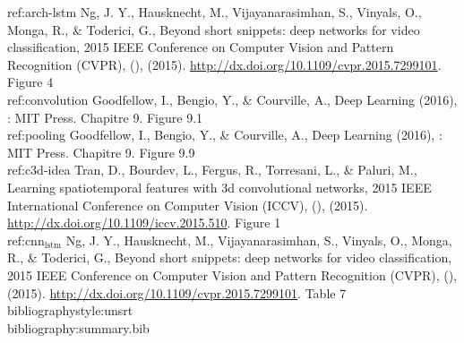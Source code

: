 \documentclass[11pt]{article}
\begin{document}
ref:arch-lstm Ng, J. Y., Hausknecht, M., Vijayanarasimhan, S., Vinyals, O., Monga, R., \& Toderici, G., Beyond short snippets: deep networks for video classification, 2015 IEEE Conference on Computer Vision and Pattern Recognition (CVPR), (),  (2015).  \url{http://dx.doi.org/10.1109/cvpr.2015.7299101}. Figure 4\\

ref:convolution Goodfellow, I., Bengio, Y., \& Courville, A., Deep Learning (2016), : MIT Press. Chapitre 9. Figure 9.1\\

ref:pooling Goodfellow, I., Bengio, Y., \& Courville, A., Deep Learning (2016), : MIT Press. Chapitre 9. Figure 9.9\\

ref:c3d-idea Tran, D., Bourdev, L., Fergus, R., Torresani, L., \& Paluri, M., Learning spatiotemporal features with 3d convolutional networks, 2015 IEEE International Conference on Computer Vision (ICCV), (),  (2015).  \url{http://dx.doi.org/10.1109/iccv.2015.510}. Figure 1\\

ref:cnn\(_{\text{lstm}}\) Ng, J. Y., Hausknecht, M., Vijayanarasimhan, S., Vinyals, O., Monga, R., \& Toderici, G., Beyond short snippets: deep networks for video classification, 2015 IEEE Conference on Computer Vision and Pattern Recognition (CVPR), (),  (2015).  \url{http://dx.doi.org/10.1109/cvpr.2015.7299101}. Table 7\\
bibliographystyle:unsrt\\
bibliography:summary.bib\\
\end{document}
